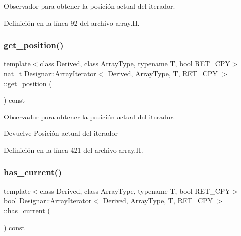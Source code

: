 Observador para obtener la posición actual del iterador. 



Definición en la línea 92 del archivo array.\+H.

\mbox{\label{class_designar_1_1_array_iterator_a209ca14a9628f0a67a258469d98089b8}} 
\subsubsection{\texorpdfstring{get\+\_\+position()}{get\_position()}}
{\footnotesize\ttfamily template$<$class Derived, class Array\+Type, typename T, bool R\+E\+T\+\_\+\+C\+PY$>$ \\
\hyperlink{namespace_designar_aa72662848b9f4815e7bf31a7cf3e33d1}{nat\+\_\+t} \hyperlink{class_designar_1_1_array_iterator}{Designar\+::\+Array\+Iterator}$<$ Derived, Array\+Type, T, R\+E\+T\+\_\+\+C\+PY $>$\+::get\+\_\+position (\begin{DoxyParamCaption}{ }\end{DoxyParamCaption}) const\hspace{0.3cm}{\ttfamily [inline]}}



Observador para obtener la posición actual del iterador. 

\begin{DoxyReturn}{Devuelve}
Posición actual del iterador 
\end{DoxyReturn}


Definición en la línea 421 del archivo array.\+H.

\mbox{\label{class_designar_1_1_array_iterator_aafec192c97299c4f21c28c65e58b19fc}} 
\subsubsection{\texorpdfstring{has\+\_\+current()}{has\_current()}}
{\footnotesize\ttfamily template$<$class Derived, class Array\+Type, typename T, bool R\+E\+T\+\_\+\+C\+PY$>$ \\
bool \hyperlink{class_designar_1_1_array_iterator}{Designar\+::\+Array\+Iterator}$<$ Derived, Array\+Type, T, R\+E\+T\+\_\+\+C\+PY $>$\+::has\+\_\+current (\begin{DoxyParamCaption}{ }\end{DoxyParamCaption}) const\hspace{0.3cm}{\ttfamily [inline]}}



